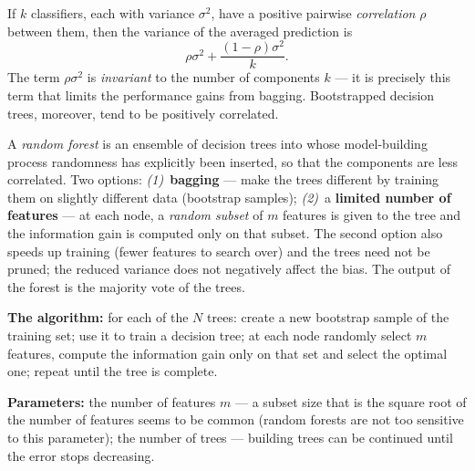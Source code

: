 \documentclass[11pt,a4paper]{article}
\theoremstyle{definition}
\begin{document}
\begin{defbox}
If $k$ classifiers, each with variance $\sigma^2$, have a positive pairwise \emph{correlation}
$\rho$ between them, then the variance of the averaged prediction is
\[ \rho\sigma^2+\frac{(1-\rho)\sigma^2}{k}. \]
The term $\rho\sigma^2$ is \emph{invariant} to the number of components $k$ --- it is precisely
this term that limits the performance gains from bagging. Bootstrapped decision trees, moreover,
tend to be positively correlated.

A \emph{random forest} is an ensemble of decision trees into whose model-building process
randomness has explicitly been inserted, so that the components are less correlated. Two options:
\emph{(1)}~\textbf{bagging} --- make the trees different by training them on slightly different
data (bootstrap samples); \emph{(2)}~a \textbf{limited number of features} --- at each node, a
\emph{random subset} of $m$ features is given to the tree and the information gain is computed
only on that subset. The second option also speeds up training (fewer features to search over) and
the trees need not be pruned; the reduced variance does not negatively affect the bias. The output
of the forest is the majority vote of the trees.

\textbf{The algorithm:} for each of the $N$ trees: create a new bootstrap sample of the training
set; use it to train a decision tree; at each node randomly select $m$ features, compute the
information gain only on that set and select the optimal one; repeat until the tree is complete.

\textbf{Parameters:} the number of features $m$ --- a subset size that is the square root of the
number of features seems to be common (random forests are not too sensitive to this parameter);
the number of trees --- building trees can be continued until the error stops decreasing.
\end{defbox}
\end{document}
